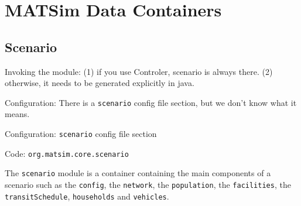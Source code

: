 \section{MATSim Data Containers}
\label{sec:matsim-containers}
\subsection{Scenario}
\label{sec:scenario}

\begin{compactitem}
\item Invoking the module: (1) if you use Controler, scenario is always there. (2) otherwise, it needs to be generated explicitly in java.  

\item Configuration: There is a \lstinline|scenario| config file section, but we don't know what it means. 

\item Configuration: \lstinline|scenario| config file section 

\item Code: \lstinline|org.matsim.core.scenario|
\end{compactitem}

The \lstinline|scenario| module is
a container containing the main components of a scenario such as the \lstinline|config|, the \lstinline|network|, the \lstinline|population|, the \lstinline|facilities|, the \lstinline|transitSchedule|, \lstinline|households| and \lstinline|vehicles|.


